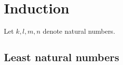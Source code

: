\documentclass[../../natural-numbers.ftl.tex]{subfiles}
\begin{document}
  \section{Induction}

  \begin{forthel}
  \end{forthel}

  \begin{forthel}
    Let $k, l, m, n$ denote natural numbers.
  \end{forthel}


  \subsection{Least natural numbers}
\end{document}
